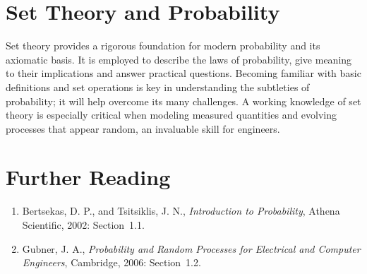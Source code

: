 \section{Set Theory and Probability}

Set theory provides a rigorous foundation for modern probability and its axiomatic basis.
It is employed to describe the laws of probability, give meaning to their implications and answer practical questions.
Becoming familiar with basic definitions and set operations is key in understanding the subtleties of probability; it will help overcome its many challenges.
A working knowledge of set theory is especially critical when modeling measured quantities and evolving processes that appear random, an invaluable skill for engineers.


\section*{Further Reading}

\begin{small}
\begin{enumerate}
\item Bertsekas, D. P., and Tsitsiklis, J. N., \emph{Introduction to Probability}, Athena Scientific, 2002: Section~1.1.
\item Gubner, J. A., \emph{Probability and Random Processes for Electrical and Computer Engineers}, Cambridge, 2006: Section~1.2.
\end{enumerate}
\end{small}

